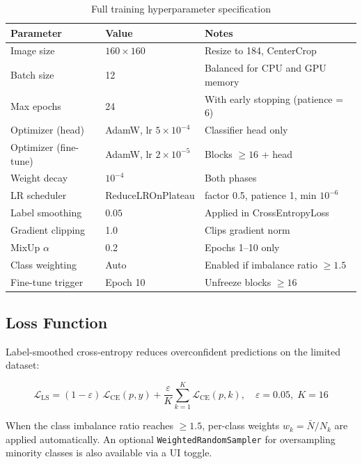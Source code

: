 \documentclass[12pt,a4paper]{article}
\begin{document}
\begin{table}[H]
\centering\small
\caption{Full training hyperparameter specification}
\renewcommand{\arraystretch}{1.2}
\begin{tabular}{@{}lll@{}}
\toprule
\textbf{Parameter} & \textbf{Value} & \textbf{Notes} \\
\midrule
\rowcolor{lightblue!20} Image size & $160\times160$ & Resize to 184, CenterCrop \\
Batch size & 12 & Balanced for CPU and GPU memory \\
\rowcolor{lightblue!20} Max epochs & 24 & With early stopping (patience = 6) \\
Optimizer (head) & AdamW, lr $5\times10^{-4}$ & Classifier head only \\
\rowcolor{lightblue!20} Optimizer (fine-tune) & AdamW, lr $2\times10^{-5}$ & Blocks $\geq16$ + head \\
Weight decay & $10^{-4}$ & Both phases \\
\rowcolor{lightblue!20} LR scheduler & ReduceLROnPlateau & factor 0.5, patience 1, min $10^{-6}$ \\
Label smoothing & $0.05$ & Applied in CrossEntropyLoss \\
\rowcolor{lightblue!20} Gradient clipping & 1.0 & Clips gradient norm \\
MixUp $\alpha$ & 0.2 & Epochs 1--10 only \\
\rowcolor{lightblue!20} Class weighting & Auto & Enabled if imbalance ratio $\geq 1.5$ \\
Fine-tune trigger & Epoch 10 & Unfreeze blocks $\geq 16$ \\
\bottomrule
\end{tabular}
\end{table}

\subsection{Loss Function}
Label-smoothed cross-entropy reduces overconfident predictions on the limited dataset:

\begin{equation}
  \mathcal{L}_\text{LS} = (1-\varepsilon)\,\mathcal{L}_\text{CE}(p,y)
  + \frac{\varepsilon}{K}\sum_{k=1}^{K}\mathcal{L}_\text{CE}(p,k),
  \quad \varepsilon=0.05,\; K=16
\end{equation}

When the class imbalance ratio reaches $\geq 1.5$, per-class weights $w_k = \bar{N}/N_k$
are applied automatically. An optional \texttt{WeightedRandomSampler} for oversampling
minority classes is also available via a UI toggle.
\end{document}
